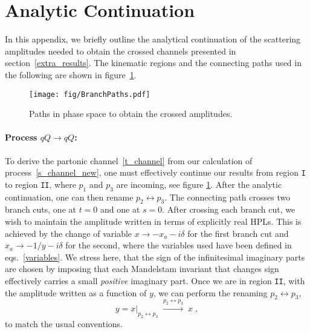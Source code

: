 
\section{Analytic Continuation} \label{sec:appC}
In this appendix, we briefly outline the analytical continuation of the scattering amplitudes needed to obtain the crossed channels presented in section~\ref{extra_results}. The kinematic regions and the connecting paths used in the following are shown in figure~\ref{KinematicsPath}.
\begin{figure}
\center
\texttt{[image: fig/BranchPaths.pdf]}
\caption{Paths in phase space to obtain the crossed amplitudes.}
\label{KinematicsPath}
\end{figure}
\paragraph{Process $ q Q \rightarrow  q Q$:} To derive the partonic channel~\eqref{t_channel} from our calculation of process~\eqref{s_channel_new}, one must effectively continue our results from region \texttt{I} to region \texttt{II}, where $p_1$ and $p_3$ are incoming, see figure \ref{KinematicsPath}. After the analytic continuation, one can then rename $p_2 \leftrightarrow p_3$.  The connecting path crosses two branch cuts, one at $t=0$ and one at $s=0$.  
After crossing each branch cut, we wish to maintain the amplitude written in terms of explicitly real HPLs.
This is achieved by the change of variable $x \rightarrow -x_a - i\delta$ for the first branch cut and $x_a \rightarrow -1/y -i \delta$ for the second, where the variables used have been defined in eqs.~\eqref{variables}.
We stress here, that the sign of the infinitesimal imaginary parts are chosen by imposing
that each Mandelstam invariant that changes sign effectively carries a small \emph{positive} imaginary part.
Once we are in region \texttt{II}, with the amplitude written as a function of $y$, 
we can perform the renaming  $p_2 \leftrightarrow p_3$,
\begin{equation}
y = x|_{p_2 \leftrightarrow p_3} \; \xrightarrow{p_2 \leftrightarrow p_3} \;x \; ,
\end{equation}
to match the usual conventions.

